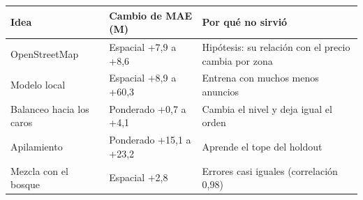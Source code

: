 \begin{tabular}{lll}
\toprule
Idea & Cambio de MAE (M) & Por qué no sirvió \\
\midrule
OpenStreetMap & Espacial +7,9 a +8,6 & Hipótesis: su relación con el precio cambia por zona \\
Modelo local & Espacial +8,9 a +60,3 & Entrena con muchos menos anuncios \\
Balanceo hacia los caros & Ponderado +0,7 a +4,1 & Cambia el nivel y deja igual el orden \\
Apilamiento & Ponderado +15,1 a +23,2 & Aprende el tope del holdout \\
Mezcla con el bosque & Espacial +2,8 & Errores casi iguales (correlación 0,98) \\
\bottomrule
\end{tabular}
